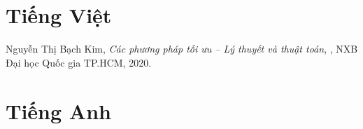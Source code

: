 
\begin{thebibliography}{99}\rm
    
    \section*{Tiếng Việt}
    
     Nguyễn Thị Bạch Kim, \textit{Các phương pháp tối ưu – Lý thuyết và thuật toán}, , NXB Đại học Quốc gia TP.HCM, 2020.
    
    \section*{Tiếng Anh}
    
    \end{thebibliography}
    
    \setcounter{lastbibitem}{\value{enumiv}}
    
    
    
    